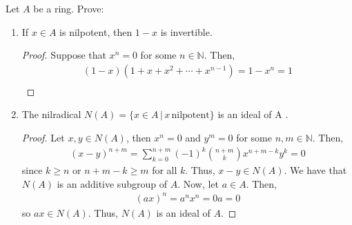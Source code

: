 \begin{problem}
    Let $A$ be a ring.
    Prove:
    \begin{enumerate}[label=(\theproblem.\arabic*),ref=\theproblem.\arabic*]

        \item \label{itm:1_minus_x_invertible} If $x \in A$ is nilpotent, then $1 - x$ is invertible.
            \begin{sol}
            \begin{proof}
                 Suppose that $x^n=0$ for some $n \in \mathbb{N}$.
                 Then,
                    \begin{align*}
                        (1-x)(1+x+x^2+\cdots+x^{n-1}) = 1-x^{n} = 1 \\
                    \end{align*}
            \end{proof}
            \end{sol}

        \item \label{itm:nilradical_is_ideal} The nilradical $N(A) = \{x \in A \, | \, x \, \text{nilpotent}\}$ is an ideal of A .
            \begin{sol}
            \begin{proof}
                Let $x,y \in N(A)$, then $x^n = 0$ and $y^m = 0$ for some $n,m \in \mathbb{N}$.
                Then,
                    \begin{align*}
                        (x-y)^{n+m} = \sum_{k=0}^{n+m} (-1)^{k} \binom{n+m}{k} x^{n+m-k} y^{k} = 0
                    \end{align*}
                since $k \geq n$ or $n+m-k \geq m$ for all $k$.
                Thus, $x-y \in N(A)$.
                We have that $N(A)$ is an additive subgroup of $A$.
                Now, let $a \in A$.
                Then,
                    \begin{align*}
                        (ax)^n = a^n x^n = 0a = 0
                    \end{align*}
                so $ax \in N(A)$.
                Thus, $N(A)$ is an ideal of $A$.
            \end{proof}
            \end{sol}


\end{enumerate}
\end{problem}
